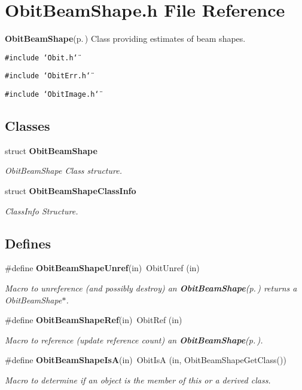 \section{Obit\-Beam\-Shape.h File Reference}
\label{ObitBeamShape_8h}
{\bf Obit\-Beam\-Shape}{\rm (p.\,\pageref{structObitBeamShape})} Class providing estimates of beam shapes. 

{\tt \#include \char`\"{}Obit.h\char`\"{}}\par
{\tt \#include \char`\"{}Obit\-Err.h\char`\"{}}\par
{\tt \#include \char`\"{}Obit\-Image.h\char`\"{}}\par
\subsection*{Classes}
\begin{CompactItemize}
\item 
struct {\bf Obit\-Beam\-Shape}
\begin{CompactList}\small\item\em Obit\-Beam\-Shape Class structure. \item\end{CompactList}\item 
struct {\bf Obit\-Beam\-Shape\-Class\-Info}
\begin{CompactList}\small\item\em Class\-Info Structure. \item\end{CompactList}\end{CompactItemize}
\subsection*{Defines}
\begin{CompactItemize}
\item 
\#define {\bf Obit\-Beam\-Shape\-Unref}(in)\ Obit\-Unref (in)
\begin{CompactList}\small\item\em Macro to unreference (and possibly destroy) an {\bf Obit\-Beam\-Shape}{\rm (p.\,\pageref{structObitBeamShape})} returns a Obit\-Beam\-Shape$\ast$. \item\end{CompactList}\item 
\#define {\bf Obit\-Beam\-Shape\-Ref}(in)\ Obit\-Ref (in)
\begin{CompactList}\small\item\em Macro to reference (update reference count) an {\bf Obit\-Beam\-Shape}{\rm (p.\,\pageref{structObitBeamShape})}. \item\end{CompactList}\item 
\#define {\bf Obit\-Beam\-Shape\-Is\-A}(in)\ Obit\-Is\-A (in, Obit\-Beam\-Shape\-Get\-Class())
\begin{CompactList}\small\item\em Macro to determine if an object is the member of this or a derived class. \item\end{CompactList}\end{CompactItemize}
